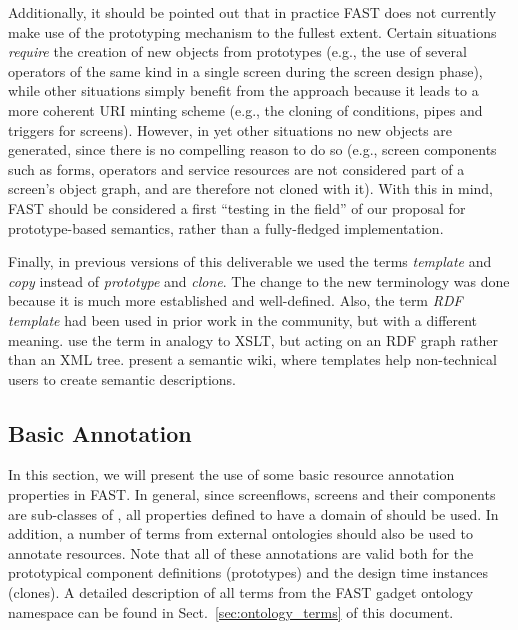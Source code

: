 \documentclass{article}
\begin{document}
Additionally, it should  be pointed out that in practice FAST does not currently make use of the prototyping mechanism to the fullest extent. Certain situations \emph{require} the creation of new objects from prototypes (e.g., the use of several operators of the same kind in a single screen during the screen design phase), while other situations simply benefit from the approach because it leads to a more coherent URI minting scheme (e.g., the cloning of conditions, pipes and triggers for screens). However, in yet other situations no new objects are generated, since there is no compelling reason to do so (e.g., screen components such as forms, operators and service resources are not considered part of a screen's object graph, and are therefore not cloned with it). With this in mind, FAST should be considered a first ``testing in the field'' of our proposal for prototype-based semantics, rather than a fully-fledged implementation.

Finally, in previous versions of this deliverable we used the terms \emph{template} and \emph{copy} instead of \emph{prototype} and \emph{clone}. The change to the new terminology was done because it is much more established and well-defined. Also, the term \emph{RDF template} had been used in prior work in the community, but with a different meaning. \cite{davis2003rdf_template} use the term in analogy to XSLT, but acting on an RDF graph rather than an XML tree. \cite{kawamoto2006kawawiki} present a semantic wiki, where templates help non-technical users to create semantic descriptions. 




\subsection{Basic Annotation} %
\label{sub:basic_annotation}

In this section, we will present the use of some basic resource annotation properties in FAST. In general, since screenflows, screens and their components are sub-classes of , all properties defined to have a domain of  should be used. In addition, a number of terms from external ontologies should also be used to annotate resources. Note that all of these annotations are valid both for the prototypical component definitions (prototypes) and the design time instances (clones). A detailed description of all terms from the FAST gadget ontology namespace can be found in Sect.~\ref{sec:ontology_terms} of this document.
\end{document}
